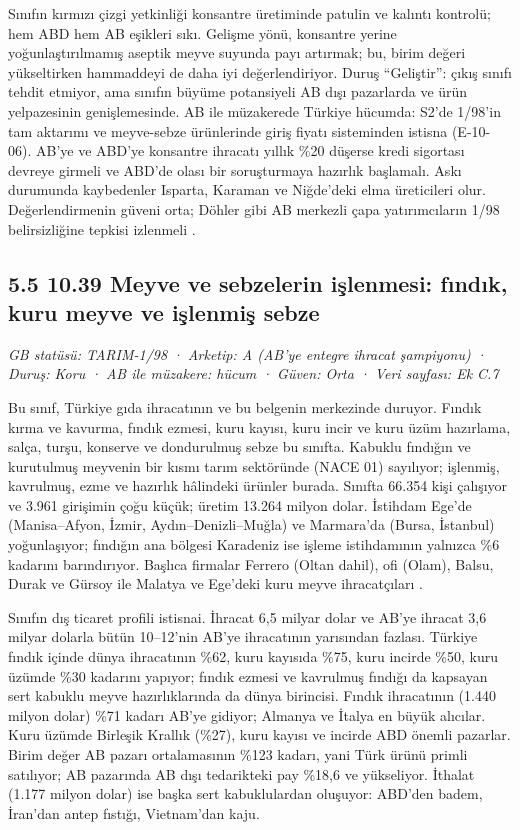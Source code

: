 Sınıfın kırmızı çizgi yetkinliği konsantre üretiminde patulin ve kalıntı kontrolü; hem ABD hem AB eşikleri sıkı. Gelişme yönü, konsantre yerine yoğunlaştırılmamış aseptik meyve suyunda payı artırmak; bu, birim değeri yükseltirken hammaddeyi de daha iyi değerlendiriyor. Duruş ``Geliştir'': çıkış sınıfı tehdit etmiyor, ama sınıfın büyüme potansiyeli AB dışı pazarlarda ve ürün yelpazesinin genişlemesinde. AB ile müzakerede Türkiye hücumda: S2'de 1/98'in tam aktarımı ve meyve-sebze ürünlerinde giriş fiyatı sisteminden istisna (E-10-06). AB'ye ve ABD'ye konsantre ihracatı yıllık \%20 düşerse kredi sigortası devreye girmeli ve ABD'de olası bir soruşturmaya hazırlık başlamalı. Askı durumunda kaybedenler Isparta, Karaman ve Niğde'deki elma üreticileri olur. Değerlendirmenin güveni orta; Döhler gibi AB merkezli çapa yatırımcıların 1/98 belirsizliğine tepkisi izlenmeli \etiketH{}.

\hypertarget{nace_kartlar_10-12-55-1039-meyve-ve-sebzelerin-iux15flenmesi-fux131ndux131k-kuru-meyve-ve-iux15flenmiux15f-sebze}{%
\subsection{5.5 10.39 Meyve ve sebzelerin işlenmesi: fındık, kuru meyve ve işlenmiş sebze}\label{nace_kartlar_10-12-55-1039-meyve-ve-sebzelerin-iux15flenmesi-fux131ndux131k-kuru-meyve-ve-iux15flenmiux15f-sebze}}

\emph{GB statüsü: TARIM-1/98 · Arketip: A (AB'ye entegre ihracat şampiyonu) · Duruş: Koru · AB ile müzakere: hücum · Güven: Orta · Veri sayfası: Ek C.7}

Bu sınıf, Türkiye gıda ihracatının ve bu belgenin merkezinde duruyor. Fındık kırma ve kavurma, fındık ezmesi, kuru kayısı, kuru incir ve kuru üzüm hazırlama, salça, turşu, konserve ve dondurulmuş sebze bu sınıfta. Kabuklu fındığın ve kurutulmuş meyvenin bir kısmı tarım sektöründe (NACE 01) sayılıyor; işlenmiş, kavrulmuş, ezme ve hazırlık hâlindeki ürünler burada. Sınıfta 66.354 kişi çalışıyor ve 3.961 girişimin çoğu küçük; üretim 13.264 milyon dolar. İstihdam Ege'de (Manisa--Afyon, İzmir, Aydın--Denizli--Muğla) ve Marmara'da (Bursa, İstanbul) yoğunlaşıyor; fındığın ana bölgesi Karadeniz ise işleme istihdamının yalnızca \%6 kadarını barındırıyor. Başlıca firmalar Ferrero (Oltan dahil), ofi (Olam), Balsu, Durak ve Gürsoy ile Malatya ve Ege'deki kuru meyve ihracatçıları \etiketH{}.

Sınıfın dış ticaret profili istisnai. İhracat 6,5 milyar dolar ve AB'ye ihracat 3,6 milyar dolarla bütün 10--12'nin AB'ye ihracatının yarısından fazlası. Türkiye fındık içinde dünya ihracatının \%62, kuru kayısıda \%75, kuru incirde \%50, kuru üzümde \%30 kadarını yapıyor; fındık ezmesi ve kavrulmuş fındığı da kapsayan sert kabuklu meyve hazırlıklarında da dünya birincisi. Fındık ihracatının (1.440 milyon dolar) \%71 kadarı AB'ye gidiyor; Almanya ve İtalya en büyük alıcılar. Kuru üzümde Birleşik Krallık (\%27), kuru kayısı ve incirde ABD önemli pazarlar. Birim değer AB pazarı ortalamasının \%123 kadarı, yani Türk ürünü primli satılıyor; AB pazarında AB dışı tedarikteki pay \%18,6 ve yükseliyor. İthalat (1.177 milyon dolar) ise başka sert kabuklulardan oluşuyor: ABD'den badem, İran'dan antep fıstığı, Vietnam'dan kaju.

